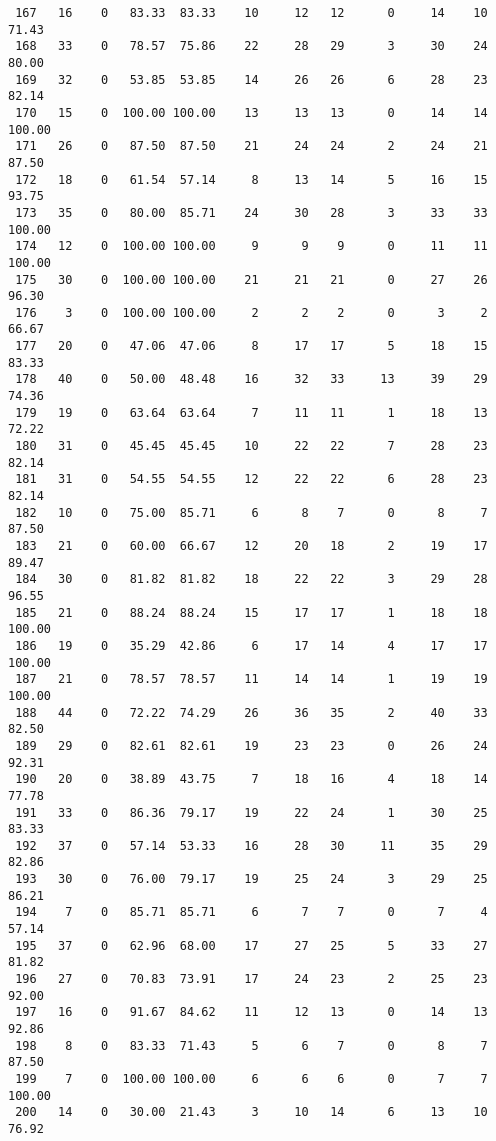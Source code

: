 \begin{verbatim}
 167   16    0   83.33  83.33    10     12   12      0     14    10    71.43
 168   33    0   78.57  75.86    22     28   29      3     30    24    80.00
 169   32    0   53.85  53.85    14     26   26      6     28    23    82.14
 170   15    0  100.00 100.00    13     13   13      0     14    14   100.00
 171   26    0   87.50  87.50    21     24   24      2     24    21    87.50
 172   18    0   61.54  57.14     8     13   14      5     16    15    93.75
 173   35    0   80.00  85.71    24     30   28      3     33    33   100.00
 174   12    0  100.00 100.00     9      9    9      0     11    11   100.00
 175   30    0  100.00 100.00    21     21   21      0     27    26    96.30
 176    3    0  100.00 100.00     2      2    2      0      3     2    66.67
 177   20    0   47.06  47.06     8     17   17      5     18    15    83.33
 178   40    0   50.00  48.48    16     32   33     13     39    29    74.36
 179   19    0   63.64  63.64     7     11   11      1     18    13    72.22
 180   31    0   45.45  45.45    10     22   22      7     28    23    82.14
 181   31    0   54.55  54.55    12     22   22      6     28    23    82.14
 182   10    0   75.00  85.71     6      8    7      0      8     7    87.50
 183   21    0   60.00  66.67    12     20   18      2     19    17    89.47
 184   30    0   81.82  81.82    18     22   22      3     29    28    96.55
 185   21    0   88.24  88.24    15     17   17      1     18    18   100.00
 186   19    0   35.29  42.86     6     17   14      4     17    17   100.00
 187   21    0   78.57  78.57    11     14   14      1     19    19   100.00
 188   44    0   72.22  74.29    26     36   35      2     40    33    82.50
 189   29    0   82.61  82.61    19     23   23      0     26    24    92.31
 190   20    0   38.89  43.75     7     18   16      4     18    14    77.78
 191   33    0   86.36  79.17    19     22   24      1     30    25    83.33
 192   37    0   57.14  53.33    16     28   30     11     35    29    82.86
 193   30    0   76.00  79.17    19     25   24      3     29    25    86.21
 194    7    0   85.71  85.71     6      7    7      0      7     4    57.14
 195   37    0   62.96  68.00    17     27   25      5     33    27    81.82
 196   27    0   70.83  73.91    17     24   23      2     25    23    92.00
 197   16    0   91.67  84.62    11     12   13      0     14    13    92.86
 198    8    0   83.33  71.43     5      6    7      0      8     7    87.50
 199    7    0  100.00 100.00     6      6    6      0      7     7   100.00
 200   14    0   30.00  21.43     3     10   14      6     13    10    76.92

\end{verbatim}
